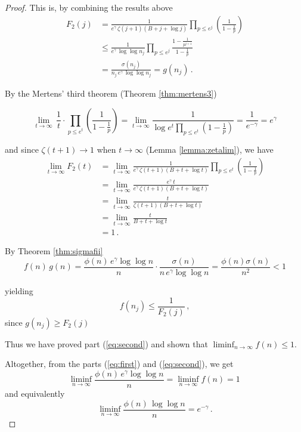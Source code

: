 \documentclass{article}
\begin{document}
\begin{theorem}
\begin{proof}
This is, by combining the results above
\begin{align*}
    F_2(j)& = \frac{1}{e^\gamma\,\zeta(j+1)(B+j+\log j)} \prod_{p\leq e^j} \left(\frac{1}{1-\frac{1}{p}}\right)\\
    & \leq \frac{1}{e^\gamma\,\log \log n_j} \prod_{p\leq e^j} \frac{1-\frac{1}{p^{j+1}}}{1-\frac{1}{p}}\\
    & = \frac{\sigma(n_j)}{n_j\,e^\gamma\,\log \log n_j} = g(n_j)\,.
\end{align*}

\clearpage

By the Mertens' third theorem (Theorem \ref{thm:mertens3})

\begin{equation*}
    \lim_{t \rightarrow \infty}\, \frac{1}{t} \cdot \prod_{p\leq e^t} \left(\frac{1}{1-\frac{1}{p}}\right) = \lim_{t \rightarrow \infty} \frac{1}{\log e^t\prod_{p\leq e^t} \left(1-\frac{1}{p}\right)} = \frac{1}{e^{-\gamma}} = e^\gamma
\end{equation*}

and since $\zeta(t+1)\rightarrow 1$ when $t\rightarrow\infty$ (Lemma \ref{lemma:zetalim}), we have
\begin{align*}
    \lim_{t \rightarrow \infty} F_2(t) & = \lim_{t \rightarrow \infty} \frac{1}{e^\gamma\,\zeta(t+1)(B+t+\log t)} \prod_{p\leq e^t} \left(\frac{1}{1-\frac{1}{p}}\right)\\
    & = \lim_{t \rightarrow \infty} \frac{e^\gamma\,t}{e^\gamma\,\zeta(t+1)(B+t+\log t)}\\
    & = \lim_{t \rightarrow \infty} \frac{t}{\zeta(t+1)(B+t+\log t)}\\
    & = \lim_{t \rightarrow \infty} \frac{t}{B+t+\log t}\\
    & = 1\,.
\end{align*}

By Theorem \ref{thm:sigmafii}
\begin{equation*}
    f(n)\,g(n) = \frac{\phi(n)\,e^\gamma \log\log n}{n} \cdot \frac{\sigma(n)}{n\,e^\gamma \log\log n} = \frac{\phi(n)\sigma(n)}{n^2}<1
\end{equation*}

yielding
\begin{equation*}
    f(n_j)\leq \frac{1}{F_2(j)}\,,
\end{equation*}
since $g(n_j) \geq F_2(j)$

Thus we have proved part (\ref{eq:second}) and shown that $\liminf_{n \rightarrow \infty}{f(n)\leq 1}$.

Altogether, from the parts (\ref{eq:first}) and (\ref{eq:second}), we get
\begin{equation*}
    \liminf_{n \rightarrow \infty}{\frac{\phi(n)\,e^\gamma \log\log n}{n}}=\liminf_{n \rightarrow \infty}{f(n)}=1\,
\end{equation*}
and equivalently
\begin{equation*}
    \liminf_{n \rightarrow \infty}{\frac{\phi(n)\,\log\log n}{n}}=e^{-\gamma}\,.
\end{equation*}
\end{proof}
\end{theorem}
\end{document}
